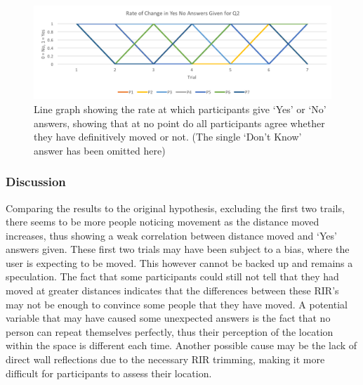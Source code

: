 \documentclass[../../main.tex]{subfiles}
\begin{document}
				\begin{figure}
					\centerline{\includegraphics[scale = 0.7]{Sections/userTesting/images/test2/rateofchange.png}}
					\caption{Line graph showing the rate at which participants give `Yes' or `No' answers, showing that at no point do all participants agree whether they have definitively moved or not. (The single `Don't Know' answer has been omitted here)}
					\label{test2rate}
				\end{figure}

			\subsubsection{Discussion}

				Comparing the results to the original hypothesis, excluding the first two trails, there seems to be more people noticing movement as the distance moved increases, thus showing a weak correlation between distance moved and `Yes' answers given. These first two trials may have been subject to a bias, where the user is expecting to be moved. This however cannot be backed up and remains a speculation. The fact that some participants could still not tell that they had moved at greater distances indicates that the differences between these \ac{RIR}'s may not be enough to convince some people that they have moved. A potential variable that may have caused some unexpected answers is the fact that no person can repeat themselves perfectly, thus their perception of the location within the space is different each time. Another possible cause may be the lack of direct wall reflections due to the necessary \ac{RIR} trimming, making it more difficult for participants to assess their location.


\end{document}

